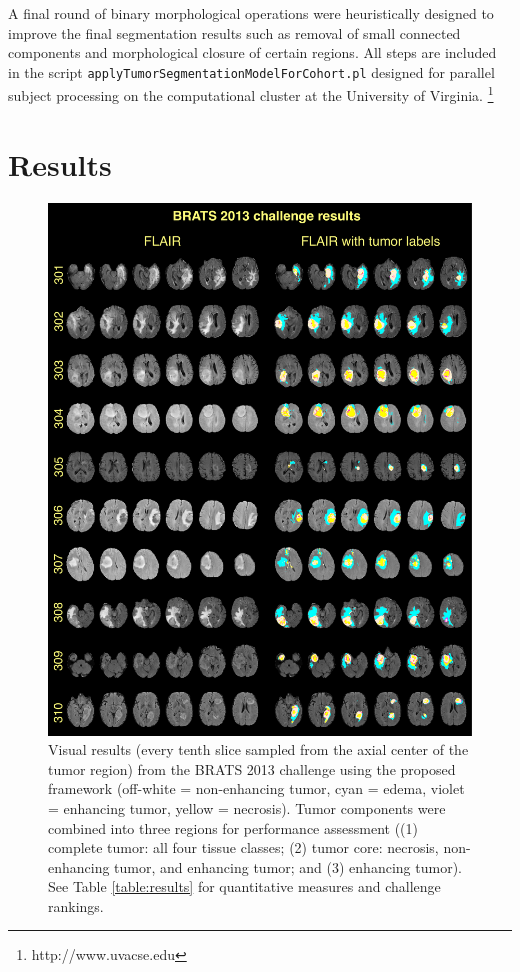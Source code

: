 \documentclass[preprint,authoryear,review,12pt]{elsarticle}
\begin{document}
A final round of binary morphological operations were heuristically designed
to improve the final segmentation results such as removal of small connected 
components and morphological closure of certain regions.
All steps are included in the script 
{\tt applyTumorSegmentationModelForCohort.pl} designed for parallel subject 
processing on the computational cluster at the University of Virginia.%
\footnote{
http://www.uvacse.edu
}




%
%

\section{Results}


\begin{figure}[!htb]
  \centering
  \includegraphics[width=120mm]{Figures/challengeResults.pdf}
  \caption{Visual results (every tenth slice sampled from the axial center of the
  tumor region) from the BRATS 2013 challenge using the proposed
  framework (off-white = non-enhancing tumor, cyan = edema, violet = enhancing 
  tumor, yellow = necrosis).  Tumor components were combined into
  three regions for performance assessment ((1) complete tumor: all four tissue
  classes; (2) tumor core:  necrosis, non-enhancing tumor, and enhancing tumor;
  and (3) enhancing tumor).  See Table \ref{table:results} for quantitative measures
  and challenge rankings.
  }
  \label{fig:challengeresults}
\end{figure}
\end{document}
